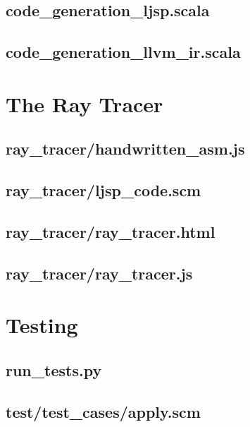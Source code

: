 \documentclass{article}
\begin{document}
    \subsection{code\_generation\_ljsp.scala}
    
    \newpage
    \subsection{code\_generation\_llvm\_ir.scala}
    
    \newpage

    \section{The Ray Tracer}
    \subsection{ray\_tracer/handwritten\_asm.js}
    
    \newpage
    \subsection{ray\_tracer/ljsp\_code.scm}
    
    \newpage
    \subsection{ray\_tracer/ray\_tracer.html}
    
    \newpage
    \subsection{ray\_tracer/ray\_tracer.js}
    
    \newpage

    \section{Testing}
    \subsection{run\_tests.py}
    
    \newpage
    \subsection{test/test\_cases/apply.scm}
    
\end{document}
